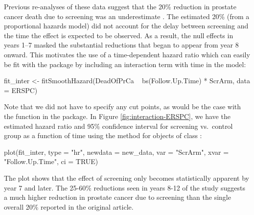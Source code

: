 Previous re-analyses of these data suggest that the 20\% reduction in
prostate cancer death due to screening was an underestimate
\citep{hanley2010mortality}. The estimated 20\% (from a proportional
hazards model) did not account for the delay between screening and the
time the effect is expected to be observed. As a result, the null
effects in years 1--7 masked the substantial reductions that began to
appear from year 8 onward. This motivates the use of a time-dependent
hazard ratio which can easily be fit with the  package by
including an interaction term with time in the model:

\begin{Schunk}
\begin{Sinput}
fit_inter <- fitSmoothHazard(DeadOfPrCa ~ bs(Follow.Up.Time) * ScrArm, 
                             data = ERSPC)
\end{Sinput}
\end{Schunk}

Note that we did not have to specify any cut points, as would be the
case with the  function in the  package.
In Figure \ref{fig:interaction-ERSPC}, we have the estimated hazard
ratio and 95\% confidence interval for screening vs.~control group as a
function of time using the  method for objects of class
:

\begin{Schunk}
\begin{Sinput}
plot(fit_inter, type = "hr", newdata = new_data,
     var = "ScrArm", xvar = "Follow.Up.Time", ci = TRUE)
\end{Sinput}
\end{Schunk}

The plot shows that the effect of screening only becomes statistically
apparent by year 7 and later. The 25-60\% reductions seen in years 8-12
of the study suggests a much higher reduction in prostate cancer due to
screening than the single overall 20\% reported in the original article.

